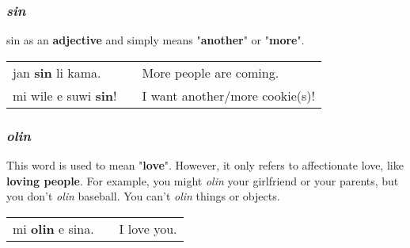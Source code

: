 \subsubsection*{\textit{sin}}
%
sin as an \textbf{adjective} and simply means "\textbf{another}" or "\textbf{more}". 

\begin{supertabular}{p{5,5cm}|ll}
jan \textbf{sin} li kama. && More people are coming. \\
mi wile e suwi \textbf{sin}! && I want another/more cookie(s)! \\
\end{supertabular} 
%
\subsubsection*{\textit{olin}}
%
This word is used to mean "\textbf{love}". 
However, it only refers to affectionate love, like \textbf{loving people}. 
For example, you might \textit{olin} your girlfriend or your parents, but you don't \textit{olin} baseball. 
You can't \textit{olin} things or objects. 

\begin{supertabular}{p{5,5cm}|ll}
mi \textbf{olin} e sina. && I love you. \\
\end{supertabular}  
%
